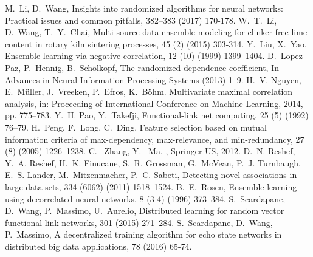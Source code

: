 \documentclass{article}
\begin{document}
\begin{thebibliography}{}
M.~Li, D.~Wang,
\newblock Insights into randomized algorithms for neural networks: Practical issues and common pitfalls,
 382--383 (2017) 170-178.
W.~T.~Li, D.~Wang, T.~Y.~Chai,
\newblock Multi-source data ensemble modeling for clinker free lime content in rotary kiln sintering processes,
 45 (2) (2015) 303-314.
Y.~Liu, X.~Yao,
\newblock Ensemble learning via negative correlation,
 12 (10) (1999) 1399--1404.
D.~Lopez-Paz, P.~Hennig, B.~Sch{\"o}lkopf,
\newblock The randomized dependence coefficient,
\newblock In {Advances in Neural Information Processing Systems} (2013) 1--9.
H.~V. Nguyen, E.~M{\"u}ller, J.~Vreeken, P.~Efros,  K.~B{\"o}hm.
\newblock Multivariate maximal correlation analysis,
\newblock  in: {Proceeding of International Conference on Machine Learning}, 2014, pp. 775--783.
Y.~H. Pao, Y.~Takefji,
\newblock Functional-link net computing,
 25 (5) (1992) 76--79.
H.~Peng, F.~Long, C.~Ding.
\newblock Feature selection based on mutual information criteria of max-dependency, max-relevance, and min-redundancy,
 27 (8) (2005) 1226--1238.
C.~ Zhang, Y.~ Ma,
, Springer US, 2012.
D.~N. Reshef, Y.~A. Reshef, H.~K. Finucane, S.~R. Grossman, G.~McVean, P.~J. Turnbaugh, E.~S. Lander, M.~Mitzenmacher, P.~C. Sabeti,
\newblock Detecting novel associations in large data sets,
 334 (6062) (2011) 1518--1524.
B.~E.~Rosen, 
\newblock Ensemble learning using decorrelated neural networks,
 8 (3-4) (1996) 373--384.
S.~Scardapane,  D.~Wang,  P.~Massimo,  U.~Aurelio,
\newblock Distributed learning for random vector functional-link networks,
 301 (2015) 271--284.
S.~Scardapane,  D.~Wang,  P.~Massimo,
\newblock A decentralized training algorithm for echo state networks in distributed big data applications,
 78 (2016) 65-74.

\end{thebibliography}
\end{document}
